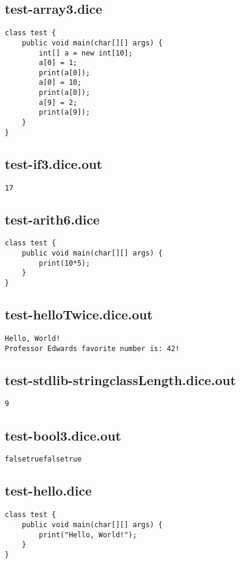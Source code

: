 \subsection{test-array3.dice}
\begin{verbatim}
class test {
	public void main(char[][] args) {
		int[] a = new int[10];
		a[0] = 1;
		print(a[0]);
		a[0] = 10;
		print(a[0]);
		a[9] = 2;
		print(a[9]);
	}
}
\end{verbatim}
\pagebreak
\subsection{test-if3.dice.out}
\begin{verbatim}
17
\end{verbatim}
\pagebreak
\subsection{test-arith6.dice}
\begin{verbatim}
class test {
	public void main(char[][] args) {
		print(10*5);
	}
}

\end{verbatim}
\pagebreak
\subsection{test-helloTwice.dice.out}
\begin{verbatim}
Hello, World!
Professor Edwards favorite number is: 42!

\end{verbatim}
\pagebreak
\subsection{test-stdlib-stringclassLength.dice.out}
\begin{verbatim}
9
\end{verbatim}
\pagebreak
\subsection{test-bool3.dice.out}
\begin{verbatim}
falsetruefalsetrue
\end{verbatim}
\pagebreak
\subsection{test-hello.dice}
\begin{verbatim}
class test {
	public void main(char[][] args) {
		print("Hello, World!");
	}
}
\end{verbatim}
\pagebreak
